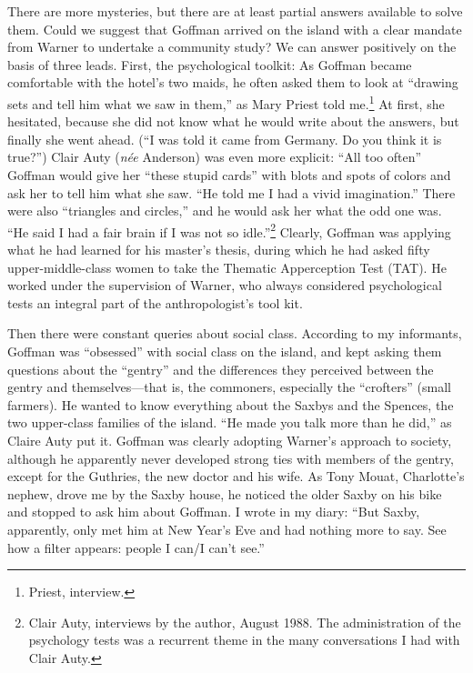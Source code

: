 \documentclass[twoside,symmetric,nobib,justified]{tufte-book}
\begin{document}
There are more mysteries, but there are at least partial answers
available to solve them. Could we suggest that Goffman arrived on the
island with a clear mandate from Warner to undertake a community study?
We can answer positively on the basis of three leads. First, the
psychological toolkit: As Goffman became comfortable with the hotel's
two maids, he often asked them to look at ``drawing sets and tell him
what we saw in them,'' as Mary Priest told me.\footnote{Priest,
  interview.} At first, she hesitated, because she did not know what he
would write about the answers, but finally she went ahead. (``I was told
it came from Germany. Do you think it is true?'') Clair Auty (\emph{n\'ee} Anderson) was even
more explicit: ``All too often'' Goffman would give her ``these stupid
cards'' with blots and spots of colors and ask her to tell him what she
saw. ``He told me I had a vivid imagination.'' There were also
``triangles and circles,'' and he would ask her what the odd one was.
``He said I had a fair brain if I was not so idle.''\footnote{Clair
  Auty, interviews by the author, August 1988. The administration of
  the psychology tests was a recurrent theme in the many conversations I
  had with Clair Auty.} Clearly, Goffman was applying what he had
learned for his master's thesis, during which he had asked fifty
upper-middle-class women to take the Thematic Apperception Test (TAT).
He worked under the supervision of Warner, who always considered
psychological tests an integral part of the anthropologist's tool kit.

Then there were constant queries about social class. According to my
informants, Goffman was ``obsessed'' with social class on the island,
and kept asking them questions about the ``gentry'' and the differences
they perceived between the gentry and themselves---that is, the
commoners, especially the ``crofters'' (small farmers). He wanted to
know everything about the Saxbys and the Spences, the two upper-class
families of the island. ``He made you talk more than he did,'' as Claire
Auty put it. Goffman was clearly adopting Warner's approach to society,
although he apparently never developed strong ties with members of the
gentry, except for the Guthries, the new doctor and his wife. As Tony
Mouat, Charlotte's nephew, drove me by the Saxby house, he noticed the
older Saxby on his bike and stopped to ask him about Goffman. I wrote in
my diary: ``But Saxby, apparently, only met him at New Year's Eve and
had nothing more to say. See how a filter appears: people I can/I can't
see.''
\end{document}
